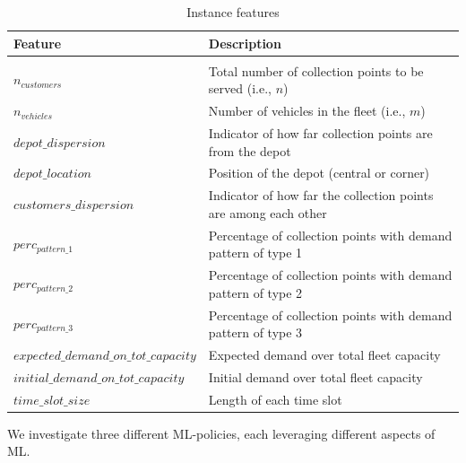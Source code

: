 \documentclass[preprint,11pt,authoryear]{elsarticle}
\begin{document}
\begin{table}[ht]
  \centering
  \begin{tabularx}{0.98\linewidth}{lX}
    \hline
    \textbf{Feature} & \textbf{Description} \\
    \hline\\\vspace{2mm}
    $n_{customers}$                    & Total number of collection points to be served (i.e., $n$)\\\vspace{2mm}
    $n_{vehicles}$                     & Number of vehicles in the fleet (i.e., $m$)\\\vspace{2mm}
    $depot\_dispersion$     & Indicator of how far collection points are from the depot \\\vspace{2mm}
    $depot\_location$                  & Position of the depot (central or corner) \\\vspace{2mm}
    $customers\_dispersion$         & Indicator of how far the collection points are among each other \\\vspace{2mm}
    $perc_{pattern\_1}$           & Percentage of collection points with demand pattern of type 1 \\\vspace{2mm}
    $perc_{pattern\_2}$             & Percentage of collection points with demand pattern of type 2 \\\vspace{2mm}
    $perc_{pattern\_3}$       & Percentage of collection points with demand pattern of type 3 \\\vspace{2mm}
$expected\_demand\_on\_tot\_capacity$ & Expected demand over total fleet capacity \\\vspace{2mm}
    $initial\_demand\_on\_tot\_capacity$  & Initial demand over total fleet capacity \\\vspace{2mm}
    $time\_slot\_size$                 & Length of each time slot \\
    \hline
  \end{tabularx}
  \caption{Instance features}
  \label{tab:features}
\end{table}



We investigate three different ML-policies, each leveraging different aspects of ML.
\end{document}
